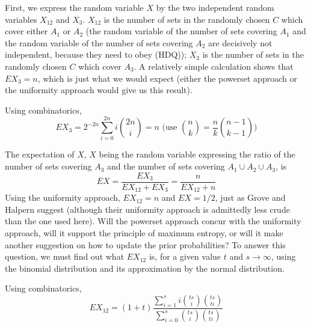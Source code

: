 \documentclass[11pt]{article}
\begin{document}
First, we express the random variable $X$ by the two independent
random variables $X_{12}$ and $X_{3}$. $X_{12}$ is the number of sets in
the randomly chosen $C$ which cover either $A_{1}$ or $A_{2}$ (the
random variable of the number of sets covering $A_{1}$ and the random
variable of the number of sets covering $A_{2}$ are decisively not
independent, because they need to obey (HDQ)); $X_{3}$ is the number
of sets in the randomly chosen $C$ which cover $A_{3}$. A relatively
simple calculation shows that $EX_{3}=n$, which is just what we
would expect (either the powerset approach or the uniformity approach
would give us this result).

Using combinatorics,
\begin{displaymath}
  EX_{3}=2^{-2n}\sum_{i=0}^{2n}i\binom{2n}{i}=n\mbox{ (use }\binom{n}{k}=\frac{n}{k}\binom{n-1}{k-1}\mbox{)}
\end{displaymath}

The expectation of $X$, $X$ being the random variable expressing the
ratio of the number of sets covering $A_{3}$ and the number of sets
covering $A_{1}\cup{}A_{2}\cup{}A_{3}$, is
\begin{displaymath}
  EX=\frac{EX_{3}}{EX_{12}+EX_{3}}=\frac{n}{EX_{12}+n}
\end{displaymath}
Using the uniformity approach, $EX_{12}=n$ and $EX=1/2$, just as Grove
and Halpern suggest (although their uniformity approach is admittedly
less crude than the one used here). Will the powerset approach concur
with the uniformity approach, will it support the principle of maximum
entropy, or will it make another suggestion on how to update the prior
probabilities? To answer this question, we must find out what $EX_{12}$
is, for a given value $t$ and $s\rightarrow\infty$, using the binomial
distribution and its approximation by the normal distribution.

Using combinatorics,
\begin{displaymath}
  EX_{12}=(1+t)\frac{\sum_{i=1}^{s}i\binom{ts}{i}\binom{ts}{ti}}{\sum_{i=0}^{s}\binom{ts}{i}\binom{ts}{ti}}
\end{displaymath}
\end{document}

